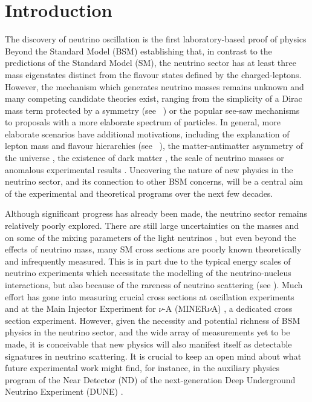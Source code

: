 \graphicspath{{}{Zprime_scattering/}}

\section{Introduction}

The discovery of neutrino oscillation is the first laboratory-based proof of physics Beyond the Standard Model (BSM) establishing that, in contrast to the predictions of the Standard Model (SM), the neutrino sector has at least three mass eigenstates distinct from the flavour states defined by the charged-leptons. However, the mechanism which generates neutrino masses remains unknown and many competing candidate theories exist, ranging from the simplicity of a Dirac mass term protected by a symmetry (see \eg\ \cite{Chulia:2016ngi,Ma:2014qra,Aranda:2013gga}) or the popular see-saw mechanisms \cite{Minkowski:1977sc,Mohapatra:1979ia,GellMann:1980vs,Yanagida:1979as,Lazarides:1980nt,Mohapatra:1980yp,Schechter:1980gr,Cheng:1980qt,Foot:1988aq} to proposals with a more elaborate spectrum of particles. In general, more elaborate scenarios have additional motivations, including the explanation of lepton mass and flavour hierarchies (see \eg\ \cite{King:2013eh}), the matter-antimatter asymmetry of the universe \cite{Fukugita:1986hr, Asaka:2005pn, Asaka:2005an}, the existence of dark matter \cite{Boehm:2006mi,Ma:2006km}, the scale of neutrino masses \cite{Gabriel:2006ns,Davidson:2009ha,Bertuzzo:2017sbj} or anomalous experimental results \cite{Nath:2016mts}. Uncovering the nature of new physics in the neutrino sector, and its connection to other BSM concerns, will be a central aim of the experimental and theoretical programs over the next few decades.

Although significant progress has already been made, the neutrino sector remains relatively poorly explored. There are still large uncertainties on the masses and on some of the mixing parameters of the light neutrinos \cite{Esteban:2018azc}, but even beyond the effects of neutrino mass, many SM cross sections are poorly known theoretically and infrequently measured. This is in part due to the typical energy scales of neutrino experiments which necessitate the mo\-del\-ling of the neutrino-nucleus interactions, but also because of the rareness of neutrino scattering (see ). Much effort has gone into measuring crucial cross sections at oscillation experiments \cite{Abe:2015biq,Adamson:2009ju,Aguilar-Arevalo:2013dva} and at the Main Injector Experiment for $\nu$-A (MINER$\nu$A) \cite{Ren:2017xov}, a dedicated cross section experiment. However, given the necessity and potential richness of BSM physics in the neutrino sector, and the wide array of measurements yet to be made, it is conceivable that new physics will also manifest itself as detectable signatures in neutrino scattering. It is crucial to keep an open mind about what future experimental work might find, for instance, in the auxiliary physics program of the Near Detector (ND) of the next-generation Deep Underground Neutrino Experiment (DUNE) \cite{Acciarri:2016crz}.

